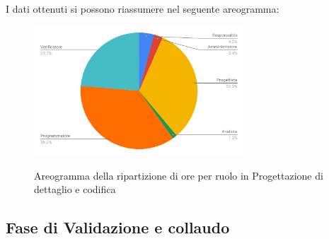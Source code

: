\pagebreak
I dati ottenuti si possono riassumere nel seguente areogramma:
\begin{figure}[H] 
			\centering 
				\includegraphics[width=0.7\textwidth]{res/images/areogramma_dettaglio.pdf}\\
				\caption{Areogramma della ripartizione di ore per ruolo in Progettazione di dettaglio e codifica}
			\label{AreogrammaDettaglio}
\end{figure}


\subsection{Fase di Validazione e collaudo}
